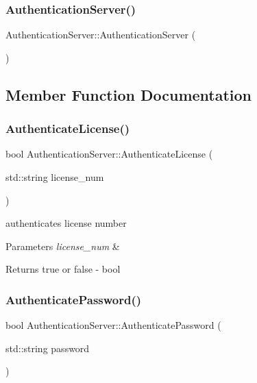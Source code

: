 \subsubsection{\texorpdfstring{Authentication\+Server()}{AuthenticationServer()}}
{\footnotesize\ttfamily Authentication\+Server\+::\+Authentication\+Server (\begin{DoxyParamCaption}{ }\end{DoxyParamCaption})}



\subsection{Member Function Documentation}
\mbox{\label{class_authentication_server_ad96db98d33cb55cb6ff720218064a447}} 
\subsubsection{\texorpdfstring{Authenticate\+License()}{AuthenticateLicense()}}
{\footnotesize\ttfamily bool Authentication\+Server\+::\+Authenticate\+License (\begin{DoxyParamCaption}\item[{std\+::string}]{license\+\_\+num }\end{DoxyParamCaption})}



authenticates license number 


\begin{DoxyParams}{Parameters}
{\em license\+\_\+num} & \\
\hline
\end{DoxyParams}
\begin{DoxyReturn}{Returns}
true or false -\/ bool 
\end{DoxyReturn}
\mbox{\label{class_authentication_server_a74f3ddb8d8a5dfc7840cae076c4971be}} 
\subsubsection{\texorpdfstring{Authenticate\+Password()}{AuthenticatePassword()}}
{\footnotesize\ttfamily bool Authentication\+Server\+::\+Authenticate\+Password (\begin{DoxyParamCaption}\item[{std\+::string}]{password }\end{DoxyParamCaption})}



